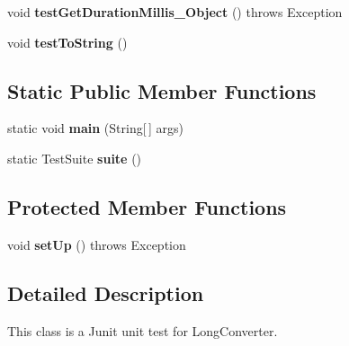 \begin{DoxyCompactItemize}
\item 
\hypertarget{classorg_1_1joda_1_1time_1_1convert_1_1_test_long_converter_a25d7e39380e810c8c2cd44bd130d808e}{void {\bfseries test\-Get\-Duration\-Millis\-\_\-\-Object} ()  throws Exception }\label{classorg_1_1joda_1_1time_1_1convert_1_1_test_long_converter_a25d7e39380e810c8c2cd44bd130d808e}

\item 
\hypertarget{classorg_1_1joda_1_1time_1_1convert_1_1_test_long_converter_a0d9248a59d1ab3e7bf217fc0fc1c79c3}{void {\bfseries test\-To\-String} ()}\label{classorg_1_1joda_1_1time_1_1convert_1_1_test_long_converter_a0d9248a59d1ab3e7bf217fc0fc1c79c3}

\end{DoxyCompactItemize}
\subsection*{Static Public Member Functions}
\begin{DoxyCompactItemize}
\item 
\hypertarget{classorg_1_1joda_1_1time_1_1convert_1_1_test_long_converter_adc2813e11dead6420ab72cafc14c8121}{static void {\bfseries main} (String\mbox{[}$\,$\mbox{]} args)}\label{classorg_1_1joda_1_1time_1_1convert_1_1_test_long_converter_adc2813e11dead6420ab72cafc14c8121}

\item 
\hypertarget{classorg_1_1joda_1_1time_1_1convert_1_1_test_long_converter_a454e10d7ea161bec15c357853b1677f6}{static Test\-Suite {\bfseries suite} ()}\label{classorg_1_1joda_1_1time_1_1convert_1_1_test_long_converter_a454e10d7ea161bec15c357853b1677f6}

\end{DoxyCompactItemize}
\subsection*{Protected Member Functions}
\begin{DoxyCompactItemize}
\item 
\hypertarget{classorg_1_1joda_1_1time_1_1convert_1_1_test_long_converter_ab8eafd07053f35cade1e4d6a2ef9bb52}{void {\bfseries set\-Up} ()  throws Exception }\label{classorg_1_1joda_1_1time_1_1convert_1_1_test_long_converter_ab8eafd07053f35cade1e4d6a2ef9bb52}

\end{DoxyCompactItemize}


\subsection{Detailed Description}
This class is a Junit unit test for Long\-Converter.

